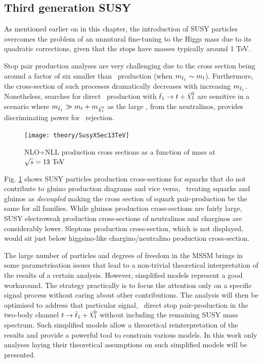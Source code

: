 		\subsection{Third generation SUSY}

			As mentioned earlier on in this chapter, the introduction of SUSY particles overcomes the problem of an unnutural fine-tuning to the Higgs mass due to its quadratic corrections, given that the stops have masses typically around 1 TeV.

			Stop pair production analyses are very challenging due to the cross section being around a factor of six smaller than \ttbar\ production (when $m_{\tilde{t}_1} \sim m_t$). Furthermore, the cross-section of such processes dramatically decreases with increasing $m_{\tilde{t}_1}$. Nonetheless, searches for direct \stopone\ production with $\stopone \ra t + \ninoone$ are sensitive in a scenario where $m_{\stopone} \gg m_t + m_{\ninoone}$ as the large \met, from the neutralinos, provides discriminating power for \ttbar\ rejection.

			\begin{figure}[!htb]
				\centering
				\texttt{[image: theory/SusyXSec13TeV]}
				\caption{\label{fig:susy_13TeV_xsec} NLO+NLL production cross sections as a function of mass at $\sqrt{s} = 13 \TeV$ \cite{Borschensky:2014cia}}
			\end{figure}

			Fig. \ref{fig:susy_13TeV_xsec} shows SUSY particles production cross-sections for squarks that do not contribute to gluino production diagrams and vice versa, \ie\ treating squarks and gluinos as \textit{decoupled} making the cross section of squark pair-production be the same for all families. While gluinos production cross-sections are fairly large, SUSY electroweak production cross-sections of neutralinos and charginos are considerably lower. Sleptons production cross-section, which is not displayed, would sit just below higgsino-like chargino/neutralino production cross-section.  

			The large number of particles and degrees of freedom in the MSSM brings in some parametrisation issues that lead to a non-trivial theoretical interpretation of the results of a certain analysis. However, simplified models represent a good workaround. The strategy \cite{Alwall2009} practically is to focus the attention only on a specific signal process without caring about other contributions. The analysis will then be optimised to address that particular signal, \eg\ direct stop pair-production in the two-body channel $t \ra \stopone + \ninoone$ without including the remaining SUSY mass spectrum. Such simplified models allow a theoretical reinterpretation of the results and provide a powerful tool to constrain various models. In this work only analyses laying their theoretical assumptions on such simplified models will be presented. 

